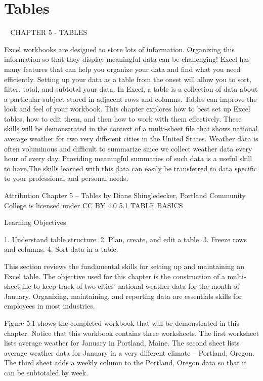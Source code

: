 \chapter{Tables}\label{ch05:tables}
                                     CHAPTER 5 - TABLES



Excel workbooks are designed to store lots of information. Organizing this information so that they
display meaningful data can be challenging! Excel has many features that can help you organize
your data and find what you need efficiently. Setting up your data as a table from the onset will
allow you to sort, filter, total, and subtotal your data. In Excel, a table is a collection of data about a
particular subject stored in adjacent rows and columns. Tables can improve the look and feel of your
workbook. This chapter explores how to best set up Excel tables, how to edit them, and then how
to work with them effectively. These skills will be demonstrated in the context of a multi-sheet file
that shows national average weather for two very different cities in the United States. Weather data is
often voluminous and difficult to summarize since we collect weather data every hour of every day.
Providing meaningful summaries of such data is a useful skill to have.The skills learned with this data
can easily be transferred to data specific to your professional and personal needs.


Attribution
Chapter 5 – Tables by Diane Shingledecker, Portland Community College is licensed under CC BY
4.0
5.1 TABLE BASICS




Learning Objectives


1. Understand table structure.
2. Plan, create, and edit a table.
3. Freeze rows and columns.
4. Sort data in a table.




This section reviews the fundamental skills for setting up and maintaining an Excel table. The
objective used for this chapter is the construction of a multi-sheet file to keep track of two cities’
national weather data for the month of January. Organizing, maintaining, and reporting data are
essentials skills for employees in most industries.

Figure 5.1 shows the completed workbook that will be demonstrated in this chapter. Notice that
this workbook contains three worksheets. The first worksheet lists average weather for January in
Portland, Maine. The second sheet lists average weather data for January in a very different climate –
Portland, Oregon. The third sheet adds a weekly column to the Portland, Oregon data so that it can
be subtotaled by week.





